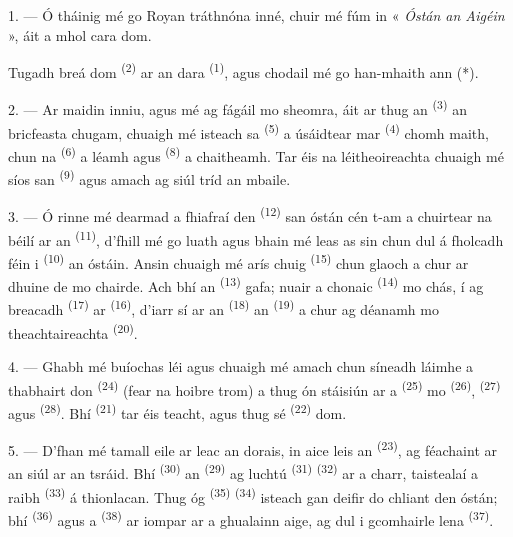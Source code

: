 1. --- Ó tháinig mé go Royan tráthnóna inné, chuir mé fúm in « \textit{Óstán an
Aigéin} », áit a mhol cara dom.

Tugadh  breá dom \textsuperscript{(2)} ar an dara 
\textsuperscript{(1)}, agus chodail mé go han-mhaith ann (*).

2. --- Ar maidin inniu, agus mé ag fágáil mo sheomra, áit ar thug an  \textsuperscript{(3)} an bricfeasta chugam, chuaigh mé isteach sa
 \textsuperscript{(5)} a úsáidtear mar  \textsuperscript{(4)} chomh maith, chun na 
\textsuperscript{(6)} a léamh agus  \textsuperscript{(8)} a chaitheamh.
Tar éis na léitheoireachta chuaigh mé síos san 
\textsuperscript{(9)} agus amach ag siúl tríd an mbaile.

3. --- Ó rinne mé dearmad a fhiafraí den  \textsuperscript{(12)}
san óstán cén t-am a chuirtear na béilí ar an 
\textsuperscript{(11)}, d'fhill mé go luath agus bhain mé leas as sin chun dul á
fholcadh féin i  \textsuperscript{(10)} an óstáin. Ansin
chuaigh mé arís chuig  \textsuperscript{(15)} chun glaoch a
chur ar dhuine de mo chairde. Ach bhí an  \textsuperscript{(13)}
gafa; nuair a chonaic  \textsuperscript{(14)} mo chás, í ag
breacadh  \textsuperscript{(17)} ar 
\textsuperscript{(16)}, d'iarr sí ar an  \textsuperscript{(18)} an
 \textsuperscript{(19)} a chur ag déanamh mo theachtaireachta  \textsuperscript{(20)}.

4. --- Ghabh mé buíochas léi agus chuaigh mé amach chun síneadh láimhe a thabhairt
don  \textsuperscript{(24)} (fear na hoibre trom) a thug ón stáisiún
ar a  \textsuperscript{(25)} mo 
\textsuperscript{(26)},  \textsuperscript{(27)} agus
 \textsuperscript{(28)}. Bhí 
\textsuperscript{(21)} tar éis teacht, agus thug sé 
\textsuperscript{(22)} dom.

5. --- D'fhan mé tamall eile ar leac an dorais, in aice leis an  \textsuperscript{(23)}, ag féachaint ar an siúl ar an tsráid. Bhí
 \textsuperscript{(30)} an  \textsuperscript{(29)} ag
luchtú  \textsuperscript{(31)} 
\textsuperscript{(32)} ar a charr, taistealaí a raibh 
\textsuperscript{(33)} á thionlacan. Thug  óg
\textsuperscript{(35)}  \textsuperscript{(34)} isteach gan deifir
do chliant den óstán; bhí  \textsuperscript{(36)} agus a
 \textsuperscript{(38)} ar iompar ar a ghualainn aige, ag dul i
gcomhairle lena  \textsuperscript{(37)}.

